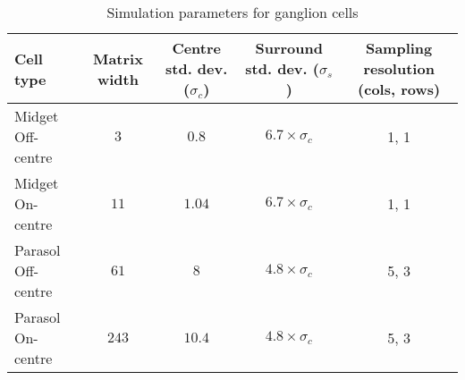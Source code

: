 \begin{table}[htb]
  \caption{Simulation parameters for ganglion cells}
  \centering
  \begin{tabular}{l c c c c}
    \begin{minipage}{1.02cm}Cell type \end{minipage}& 
    \begin{minipage}{0.5cm} \centering Matrix width \end{minipage}&  
    \begin{minipage}{1.3cm}\centering Centre std. dev. ($\sigma_c$)\end{minipage} & 
    \begin{minipage}{1.3cm}\centering Surround std. dev. ($\sigma_s$)\end{minipage} & 
    \begin{minipage}{1.4cm}\centering Sampling resolution (cols, rows)\end{minipage} \\
    \hline
    \begin{minipage}{1.2cm}\vspace*{0.1cm} Midget Off-centre \vspace*{0.005cm} \end{minipage}& 
    \begin{minipage}{0.5cm}\centering$3$ \end{minipage}& 
    $0.8$ & $6.7 \times \sigma_c$ & 1, 1\\
    \begin{minipage}{1.2cm} Midget On-centre \vspace*{0.005cm}\end{minipage} & 
    \begin{minipage}{0.5cm}\centering $11$ \end{minipage}& 
    $1.04$ & $6.7 \times \sigma_c$ &  1, 1\\
    \begin{minipage}{1.2cm}Parasol Off-centre \vspace*{0.005cm}\end{minipage} & 
    \begin{minipage}{1cm}\centering $61$ \end{minipage}& 
    $8$ & $4.8 \times \sigma_c$ & 5, 3 \\
    \begin{minipage}{1.2cm} Parasol On-centre \vspace*{0.005cm}\end{minipage} & 
    \begin{minipage}{0.5cm}\centering $243$\end{minipage} &
    $10.4$ & $4.8 \times \sigma_c$ & 5, 3
  \end{tabular}
  \label{tab-kernel-specs}
  \vspace*{-5pt}
\end{table}
